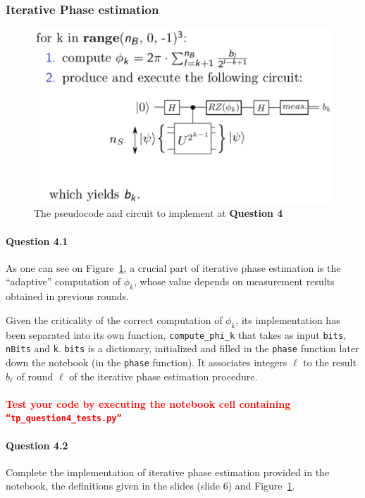 \documentclass{article}
\begin{document}
\subsubsection{Iterative Phase estimation}

\begin{figure}
\centering
\includegraphics[width=.6\textwidth]{pseudo_code.eps}
\caption{The pseudocode and circuit to implement at \textbf{Question 4}}
\label{pseudocode}
\end{figure}

\paragraph{Question 4.1} As one can see on Figure~\ref{pseudocode},
a crucial part of iterative phase estimation is the ``adaptive''
computation of $\phi_k$, whose value depends on measurement results
obtained in previous rounds.

Given the criticality of the correct computation of $\phi_k$, its 
implementation has been separated into its own function, {\tt compute\_phi\_k}
that takes as input {\tt bits}, {\tt nBits} and {\tt k}. {\tt bits} is 
a dictionary, initialized and filled in the {\tt phase} function
later down the notebook (in the {\tt phase} function). It associates integers
$\ell$ to the result $b_{\ell}$ of round $\ell$ of the iterative phase estimation procedure. 

\paragraph{} \textbf{\textcolor{red}{Test your code by executing the notebook cell containing {\tt ``tp\_question4\_tests.py''}}}

\paragraph{Question 4.2} Complete the implementation of iterative phase estimation provided in the notebook, 
the definitions given in the slides (slide 6) and Figure~\ref{pseudocode}.
\end{document}
